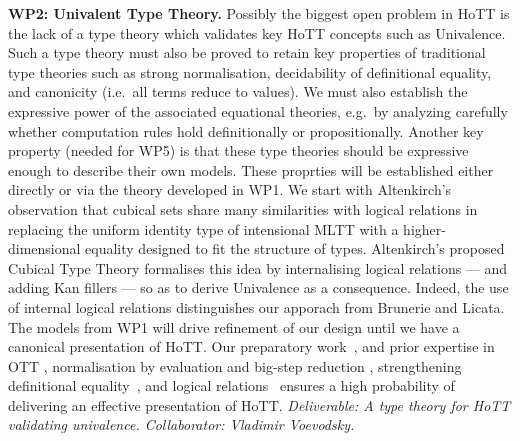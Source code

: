 \documentclass[a4paper,11pt]{article}
\begin{document}
{\bf WP2: Univalent Type Theory.}  Possibly the biggest open problem
in HoTT is the lack of a type theory which validates key HoTT concepts
such as Univalence. Such a type theory must also be proved to retain key
properties of traditional type theories such as strong normalisation,
decidability of definitional equality, and canonicity ({i.e.}~all
terms reduce to values). We must also establish the expressive power
of the associated equational theories, {e.g.}~by analyzing carefully
whether computation rules hold definitionally or
propositionally. Another key property (needed for WP5) is that these
type theories should be expressive enough to describe their own
models. These proprties will be established either directly or via the theory
developed in WP1. We start with Altenkirch's observation \cite{txa-ihp14} that cubical
sets share many similarities with logical relations in replacing the
uniform identity type of intensional MLTT with a higher-dimensional
equality designed to fit the structure of types. Altenkirch's proposed
Cubical Type Theory formalises this idea by internalising logical
relations --- and adding Kan fillers --- so as to derive Univalence as a consequence. Indeed, the use
of internal logical relations distinguishes our apporach from Brunerie
and Licata.  The models from WP1 will drive refinement of our design
until we have a canonical presentation of HoTT. Our preparatory
work~\cite{txa-ihp14}, and prior expertise in OTT
\cite{alti:ott-conf}, normalisation by evaluation and big-step
reduction \cite{alti:lics96}, %
strengthening definitional
equality~\cite{Allais:2013:NEN:2502409.2502411}, and logical
relations~\cite{neil2014relParamDep} ensures a high probability of
delivering an effective presentation of HoTT.  {\em Deliverable: A
  type theory for HoTT validating univalence.  Collaborator: Vladimir
  Voevodsky.  } 




\end{document}
